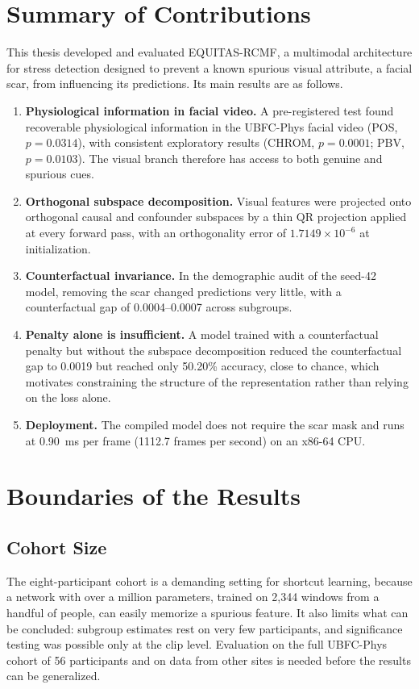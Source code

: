 \section{Summary of Contributions}
This thesis developed and evaluated EQUITAS-RCMF, a multimodal architecture for stress detection designed to prevent a known spurious visual attribute, a facial scar, from influencing its predictions. Its main results are as follows.
\begin{enumerate}
    \item \textbf{Physiological information in facial video.} A pre-registered test found recoverable physiological information in the UBFC-Phys facial video (POS, $p = 0.0314$), with consistent exploratory results (CHROM, $p = 0.0001$; PBV, $p = 0.0103$). The visual branch therefore has access to both genuine and spurious cues.
    \item \textbf{Orthogonal subspace decomposition.} Visual features were projected onto orthogonal causal and confounder subspaces by a thin QR projection applied at every forward pass, with an orthogonality error of $1.7149 \times 10^{-6}$ at initialization.
    \item \textbf{Counterfactual invariance.} In the demographic audit of the seed-42 model, removing the scar changed predictions very little, with a counterfactual gap of 0.0004--0.0007 across subgroups.
    \item \textbf{Penalty alone is insufficient.} A model trained with a counterfactual penalty but without the subspace decomposition reduced the counterfactual gap to 0.0019 but reached only 50.20\% accuracy, close to chance, which motivates constraining the structure of the representation rather than relying on the loss alone.
    \item \textbf{Deployment.} The compiled model does not require the scar mask and runs at 0.90~ms per frame (1112.7 frames per second) on an x86-64 CPU.
\end{enumerate}

\section{Boundaries of the Results}
\subsection{Cohort Size}
The eight-participant cohort is a demanding setting for shortcut learning, because a network with over a million parameters, trained on 2,344 windows from a handful of people, can easily memorize a spurious feature. It also limits what can be concluded: subgroup estimates rest on very few participants, and significance testing was possible only at the clip level. Evaluation on the full UBFC-Phys cohort of 56 participants and on data from other sites is needed before the results can be generalized.


